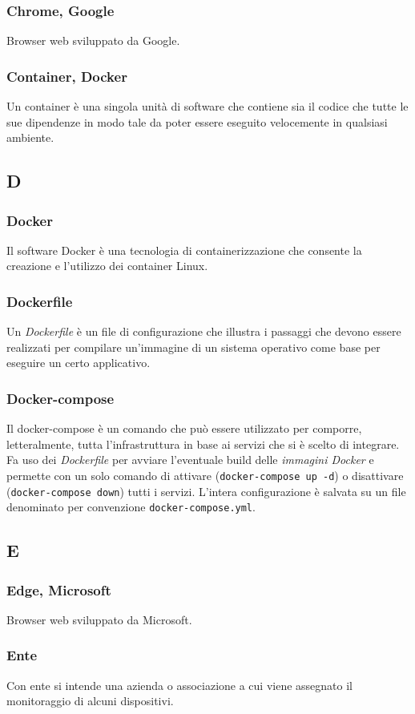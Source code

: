 \subsubsection{Chrome, Google}
Browser web sviluppato da Google.
\subsubsection{Container, Docker}
Un container è una singola unità di software che contiene sia il codice che tutte le sue dipendenze in modo tale da poter essere eseguito velocemente in qualsiasi ambiente.
\subsection{D}
\subsubsection{Docker}  Il software Docker è una tecnologia di containerizzazione che consente la creazione e l'utilizzo dei container Linux.
\subsubsection{Dockerfile}  Un \textit{Dockerfile} è un file di configurazione che illustra i passaggi che devono essere realizzati per compilare un'immagine di un sistema operativo come base per eseguire un certo applicativo.
\subsubsection{Docker-compose}  Il docker-compose è un comando che può essere utilizzato per comporre, letteralmente, tutta l'infrastruttura in base ai servizi che si è scelto di integrare. Fa uso dei \textit{Dockerfile} per avviare l'eventuale build delle \textit{immagini Docker} e permette con un solo comando di attivare (\verb!docker-compose up -d!) o disattivare (\verb!docker-compose down!) tutti i servizi. L'intera configurazione è salvata su un file denominato per convenzione \verb!docker-compose.yml!.
\subsection{E}
\subsubsection{Edge, Microsoft}
Browser web sviluppato da Microsoft.
\subsubsection{Ente}
Con ente si intende una azienda o associazione a cui viene assegnato il monitoraggio di alcuni dispositivi.
